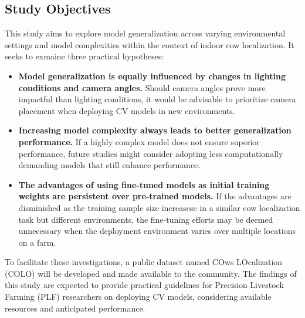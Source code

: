 \subsection*{Study Objectives}

This study aims to explore model generalization across varying environmental settings and model complexities within the context of indoor cow localization. It seeks to exmaine three practical hypotheses:

\begin{itemize}
    \item \textbf{Model generalization is equally influenced by changes in lighting conditions and camera angles.} Should camera angles prove more impactful than lighting conditions, it would be advisable to prioritize camera placement when deploying CV models in new environments.
    \item \textbf{Increasing model complexity always leads to better generalization performance.} If a highly complex model does not ensure superior performance, future studies might consider adopting less computationally demanding models that still enhance performance.
    \item \textbf{The advantages of using fine-tuned models as initial training weights are persistent over pre-trained models.} If the advantages are disminished as the training sample size increasese in a similar cow localization task but different environments, the fine-tuning efforts may be deemed unnecessary when the deployment environment varies over multiple locations on a farm.
\end{itemize}

To facilitate these investigations, a public dataset named COws LOcalization (COLO) will be developed and made available to the community. The findings of this study are expected to provide practical guidelines for Precision Livestock Farming (PLF) researchers on deploying CV models, considering available resources and anticipated performance.
